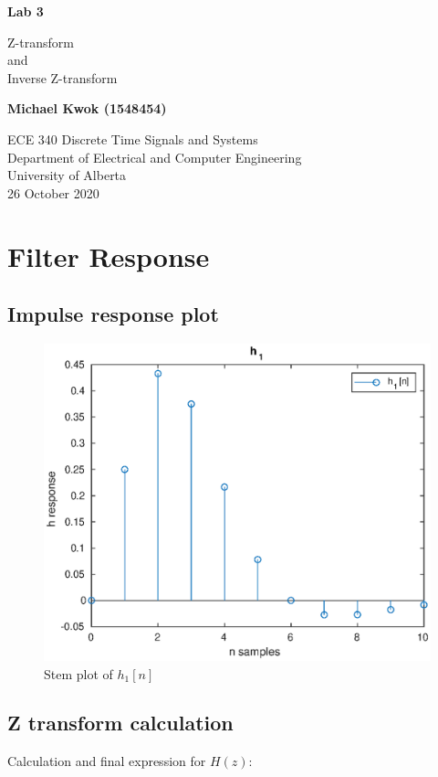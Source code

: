 \documentclass{article}
\begin{document}
\begin{titlepage}
	\begin{center}
		\vspace*{1cm}

		\huge{\textbf{Lab 3}}

		\vspace{0.5cm}

		\LARGE{Z-transform\\and\\Inverse Z-transform}
		\vspace{5cm}

		\Large{\textbf{Michael Kwok (1548454)}}

		\vfill
		ECE 340 Discrete Time Signals and Systems\\
		Department of Electrical and Computer Engineering\\
		University of Alberta\\
		26 October 2020
	\end{center}
\end{titlepage}
\section{Filter Response}
\subsection{Impulse response plot}
\begin{figure}[H]
	\centering
	\includegraphics[width=0.4\linewidth]{h1}
	\caption{Stem plot of \(h_1[n]\)}
\end{figure}

\subsection{Z transform calculation}
Calculation and final expression for \(H(z)\):
\end{document}
